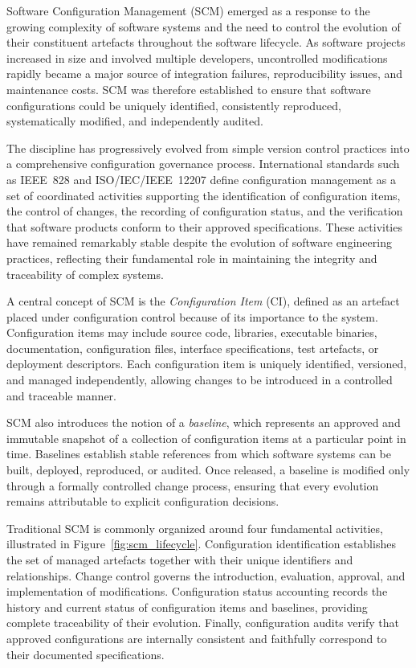 \documentclass[10pt]{article}
\begin{document}
Software Configuration Management (SCM) emerged as a response to the growing complexity of software systems and the need to control the evolution of their constituent artefacts throughout the software lifecycle. As software projects increased in size and involved multiple developers, uncontrolled modifications rapidly became a major source of integration failures, reproducibility issues, and maintenance costs. SCM was therefore established to ensure that software configurations could be uniquely identified, consistently reproduced, systematically modified, and independently audited.

The discipline has progressively evolved from simple version control practices into a comprehensive configuration governance process. International standards such as IEEE~828 and ISO/IEC/IEEE~12207 define configuration management as a set of coordinated activities supporting the identification of configuration items, the control of changes, the recording of configuration status, and the verification that software products conform to their approved specifications. These activities have remained remarkably stable despite the evolution of software engineering practices, reflecting their fundamental role in maintaining the integrity and traceability of complex systems.

A central concept of SCM is the \emph{Configuration Item} (CI), defined as an artefact placed under configuration control because of its importance to the system. Configuration items may include source code, libraries, executable binaries, documentation, configuration files, interface specifications, test artefacts, or deployment descriptors. Each configuration item is uniquely identified, versioned, and managed independently, allowing changes to be introduced in a controlled and traceable manner.

SCM also introduces the notion of a \emph{baseline}, which represents an approved and immutable snapshot of a collection of configuration items at a particular point in time. Baselines establish stable references from which software systems can be built, deployed, reproduced, or audited. Once released, a baseline is modified only through a formally controlled change process, ensuring that every evolution remains attributable to explicit configuration decisions.

Traditional SCM is commonly organized around four fundamental activities, illustrated in Figure~\ref{fig:scm_lifecycle}. Configuration identification establishes the set of managed artefacts together with their unique identifiers and relationships. Change control governs the introduction, evaluation, approval, and implementation of modifications. Configuration status accounting records the history and current status of configuration items and baselines, providing complete traceability of their evolution. Finally, configuration audits verify that approved configurations are internally consistent and faithfully correspond to their documented specifications.
\end{document}
